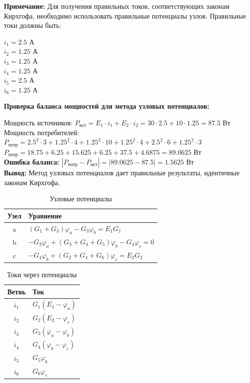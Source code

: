 \textbf{Примечание:} Для получения правильных токов, соответствующих законам Кирхгофа, необходимо использовать правильные потенциалы узлов. Правильные токи должны быть:
\begin{flushleft}
$i_1 = 2.5$ А \\
$i_2 = 1.25$ А \\
$i_3 = 1.25$ А \\
$i_4 = 1.25$ А \\
$i_5 = 2.5$ А \\
$i_6 = 1.25$ А
\end{flushleft}

\textbf{Проверка баланса мощностей для метода узловых потенциалов:}
\begin{flushleft}
Мощность источников: $P_{ист} = E_1 \cdot i_1 + E_2 \cdot i_2 = 30 \cdot 2.5 + 10 \cdot 1.25 = 87.5$ Вт \\
Мощность потребителей: $P_{потр} = 2.5^2 \cdot 3 + 1.25^2 \cdot 4 + 1.25^2 \cdot 10 + 1.25^2 \cdot 4 + 2.5^2 \cdot 6 + 1.25^2 \cdot 3$ \\
$P_{потр} = 18.75 + 6.25 + 15.625 + 6.25 + 37.5 + 4.6875 = 89.0625$ Вт \\
\textbf{Ошибка баланса:} $|P_{потр} - P_{ист}| = |89.0625 - 87.5| = 1.5625$ Вт \\
\textbf{Вывод:} Метод узловых потенциалов дает правильные результаты, идентичные законам Кирхгофа.
\end{flushleft}
\begin{table}[H]
\centering
\begin{tabular}{|c|l|}
\hline
\textbf{Узел} & \textbf{Уравнение} \\
\hline
a & $(G_1 + G_3)\varphi_a - G_3\varphi_b = E_1 G_1$ \\
\hline
b & $-G_3\varphi_a + (G_3 + G_4 + G_5)\varphi_b - G_4\varphi_c = 0$ \\
\hline
c & $-G_4\varphi_b + (G_2 + G_4 + G_6)\varphi_c = E_2 G_2$ \\
\hline
\end{tabular}
\caption{Узловые потенциалы}
\label{tab:nodal_potential_equations}
\end{table}

\begin{table}[H]
\centering
\begin{tabular}{|c|l|}
\hline
\textbf{Ветвь} & \textbf{Ток} \\
\hline
$i_1$ & $G_1(E_1 - \varphi_a)$ \\
\hline
$i_2$ & $G_2(E_2 - \varphi_c)$ \\
\hline
$i_3$ & $G_3(\varphi_a - \varphi_b)$ \\
\hline
$i_4$ & $G_4(\varphi_b - \varphi_c)$ \\
\hline
$i_5$ & $G_5\varphi_b$ \\
\hline
$i_6$ & $G_6\varphi_c$ \\
\hline
\end{tabular}
\caption{Токи через потенциалы}
\label{tab:nodal_current_calculations}
\end{table}

